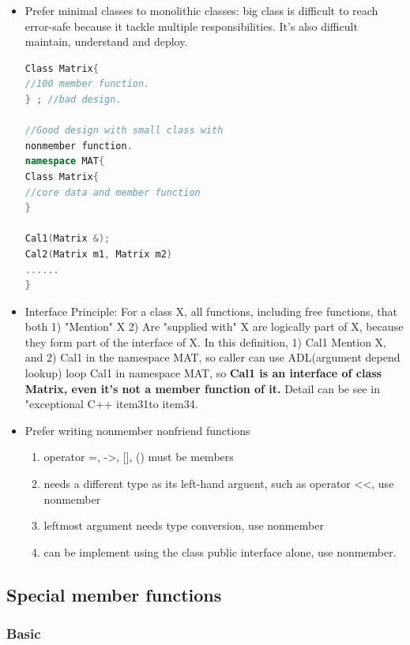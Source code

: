 \documentclass[a4paper,12pt,twoside]{book}
\begin{document}
\begin{itemize}
\item Prefer minimal classes to monolithic classes: big class is difficult to reach error-safe because it tackle multiple responsibilities. It's also difficult maintain, understand and deploy.
\begin{lstlisting}[frame=single, language=c++]
Class Matrix{
//100 member function.
} ; //bad design.

//Good design with small class with
nonmember function.
namespace MAT{
Class Matrix{
//core data and member function
}

Cal1(Matrix &);
Cal2(Matrix m1, Matrix m2)
......
}
\end{lstlisting}

\item Interface Principle: For a class X, all functions, including free functions, that both
1) "Mention" X 2) Are "supplied with" X  are logically part of X, because they form part of the interface of X.  In this definition, 1) Cal1 Mention X,  and 2) Cal1 in the namespace MAT, so caller can use ADL(argument depend lookup) loop Cal1 in namespace MAT, so \textbf{Cal1 is an interface of class Matrix, even it's not a member function of it.} Detail can be see in "exceptional C++ item31to item34.

\item Prefer writing nonmember nonfriend functions
\begin{enumerate}
\item operator =, ->, [], () must be members
\item needs a different type as its left-hand arguent, such as operator <<, use nonmember
\item leftmost argument needs type conversion, use nonmember
\item can be implement using the class public interface alone, use nonmember.
\end{enumerate}

\end{itemize}

\subsection{Special member functions}


\subsubsection{Basic}
\end{document}
